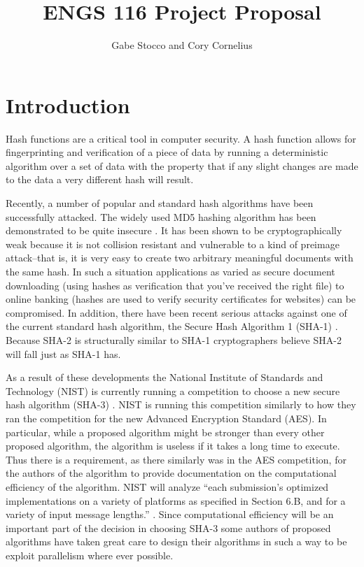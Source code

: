 \documentclass{article}
\title{ENGS 116 Project Proposal}
\author{Gabe Stocco and Cory Cornelius}
\begin{document}
\maketitle

\section*{Introduction}
Hash functions are a critical tool in computer security.
A hash function allows for fingerprinting and verification of a piece of data by running a deterministic algorithm over a set of data with the property that if any slight changes are made to the data a very different hash will result.

Recently, a number of popular and standard hash algorithms have been successfully attacked.
The widely used MD5 hashing algorithm has been demonstrated to be quite insecure \cite{Nostradamus}.
It has been shown to be cryptographically weak because it is not collision resistant and vulnerable to a kind of preimage attack--that is, it is very easy to create two arbitrary meaningful documents with the same hash.
In such a situation applications as varied as secure document downloading (using hashes as verification that you've received the right file) to online banking (hashes are used to verify security certificates for websites) can be compromised.
In addition, there have been recent serious attacks against one of the current standard hash algorithm, the Secure Hash Algorithm 1 (SHA-1) \cite{Sha1Collisions}.
Because SHA-2 is structurally similar to SHA-1 cryptographers believe SHA-2 will fall just as SHA-1 has.

As a result of these developments the National Institute of Standards and Technology (NIST) is currently running a competition to choose a new secure hash algorithm (SHA-3) \cite{Sha3Request}.
NIST is running this competition similarly to how they ran the competition for the new Advanced Encryption Standard (AES).
In particular, while a proposed algorithm might be stronger than every other proposed algorithm, the algorithm is useless if it takes a long time to execute.
Thus there is a requirement, as there similarly was in the AES competition, for the authors of the algorithm to provide documentation on the computational efficiency of the algorithm.
NIST will analyze ``each submission’s optimized implementations on a variety of platforms as specified in Section 6.B, and for a variety of input message lengths.'' \cite{Sha3Request}.
Since computational efficiency will be an important part of the decision in choosing SHA-3 some authors of proposed algorithms have taken great care to design their algorithms in such a way to be exploit parallelism where ever possible.
\end{document}
